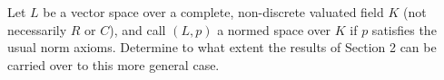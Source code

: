 Let $L$ be a vector space over a complete, non-discrete valuated field $K$ (not necessarily $R$ or $C$), and call $(L, p)$ a normed space over $K$ if $p$ satisfies the usual norm axioms. Determine to what extent the results of Section 2 can be carried over to this more general case.

